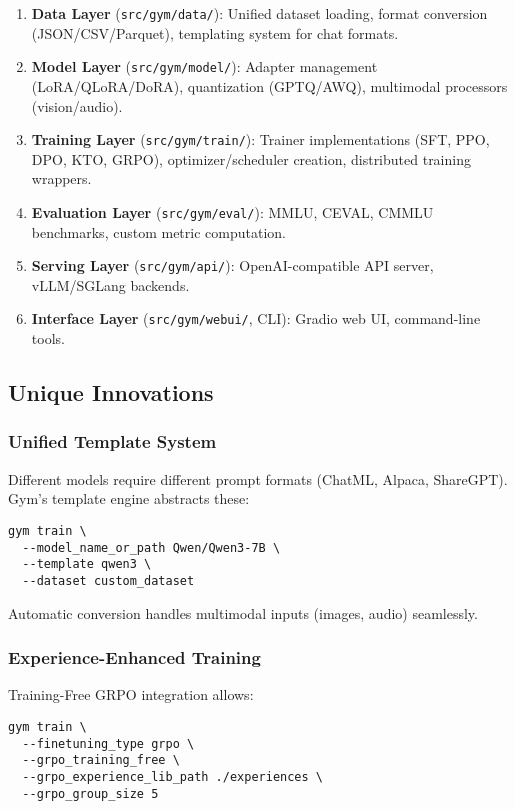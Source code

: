 \documentclass[twocolumn,11pt]{article}
\begin{document}
\begin{enumerate}
    \item \textbf{Data Layer} (\texttt{src/gym/data/}): Unified dataset loading, format conversion (JSON/CSV/Parquet), templating system for chat formats.
    \item \textbf{Model Layer} (\texttt{src/gym/model/}): Adapter management (LoRA/QLoRA/DoRA), quantization (GPTQ/AWQ), multimodal processors (vision/audio).
    \item \textbf{Training Layer} (\texttt{src/gym/train/}): Trainer implementations (SFT, PPO, DPO, KTO, GRPO), optimizer/scheduler creation, distributed training wrappers.
    \item \textbf{Evaluation Layer} (\texttt{src/gym/eval/}): MMLU, CEVAL, CMMLU benchmarks, custom metric computation.
    \item \textbf{Serving Layer} (\texttt{src/gym/api/}): OpenAI-compatible API server, vLLM/SGLang backends.
    \item \textbf{Interface Layer} (\texttt{src/gym/webui/}, CLI): Gradio web UI, command-line tools.
\end{enumerate}

\subsection{Unique Innovations}

\subsubsection{Unified Template System}
Different models require different prompt formats (ChatML, Alpaca, ShareGPT). Gym's template engine abstracts these:

\begin{verbatim}
gym train \
  --model_name_or_path Qwen/Qwen3-7B \
  --template qwen3 \
  --dataset custom_dataset
\end{verbatim}

Automatic conversion handles multimodal inputs (images, audio) seamlessly.

\subsubsection{Experience-Enhanced Training}
Training-Free GRPO integration allows:

\begin{verbatim}
gym train \
  --finetuning_type grpo \
  --grpo_training_free \
  --grpo_experience_lib_path ./experiences \
  --grpo_group_size 5
\end{verbatim}
\end{document}
